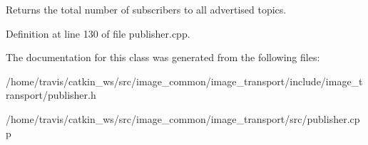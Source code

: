 Returns the total number of subscribers to all advertised topics. 

Definition at line 130 of file publisher.\-cpp.



The documentation for this class was generated from the following files\-:\begin{DoxyCompactItemize}
\item 
/home/travis/catkin\-\_\-ws/src/image\-\_\-common/image\-\_\-transport/include/image\-\_\-transport/publisher.\-h\item 
/home/travis/catkin\-\_\-ws/src/image\-\_\-common/image\-\_\-transport/src/publisher.\-cpp\end{DoxyCompactItemize}
